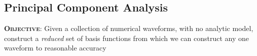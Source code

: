 \documentclass[a0,landscape]{a0poster}
\begin{document}
\begin{multicols}{4}
%
%
%

\section*{\centering Principal Component Analysis}

{\bf \textsc{Objective}}: Given a collection of numerical waveforms, with no analytic
model, construct a \emph{reduced} set of basis functions from which we can
construct any one waveform to reasonable accuracy


\end{multicols}
\end{document}
